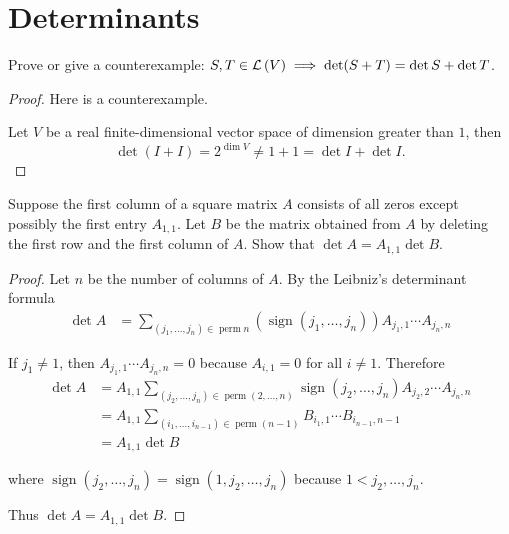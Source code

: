 \section{Determinants}

\begin{exercise}\label{chapter9:sectionC:exercise1}
    Prove or give a counterexample: $S, T\in\mathcal{L}\left({V}\right)\implies \det(S + T) = \det S + \det T$.
\end{exercise}

\begin{proof}
    Here is a counterexample.

    Let $V$ be a real finite-dimensional vector space of dimension greater than $1$, then
    \[
        \det(I + I) = 2^{\dim V} \ne 1 + 1 = \det I + \det I.
    \]
\end{proof}
\newpage

\begin{exercise}\label{chapter9:sectionC:exercise2}
    Suppose the first column of a square matrix $A$ consists of all zeros except possibly the first entry $A_{1,1}$. Let $B$ be the matrix obtained from $A$ by deleting the first row and the first column of $A$. Show that $\det A = A_{1,1} \det B$.
\end{exercise}

\begin{proof}
    Let $n$ be the number of columns of $A$. By the Leibniz's determinant formula
    \begin{align*}
        \det A & = \sum_{(j_{1}, \ldots, j_{n})\in\operatorname{perm}n}(\operatorname{sign}(j_{1}, \ldots, j_{n}))A_{j_{1},1}\cdots A_{j_{n},n}
    \end{align*}

    If $j_{1}\ne 1$, then $A_{j_{1},1}\cdots A_{j_{n},n} = 0$ because $A_{i,1} = 0$ for all $i\ne 1$. Therefore
    \begin{align*}
        \det A & = A_{1,1}\sum_{(j_{2}, \ldots, j_{n})\in\operatorname{perm}(2,\ldots,n)}\operatorname{sign}(j_{2}, \ldots, j_{n})A_{j_{2},2}\cdots A_{j_{n},n} \\
               & = A_{1,1}\sum_{(i_{1},\ldots, i_{n-1})\in\operatorname{perm}(n-1)}B_{i_{1},1}\cdots B_{i_{n-1},n-1}                                            \\
               & = A_{1,1}\det B
    \end{align*}

    where $\operatorname{sign}(j_{2}, \ldots, j_{n}) = \operatorname{sign}(1, j_{2}, \ldots, j_{n})$ because $1 < j_{2}, \ldots, j_{n}$.

    Thus $\det A = A_{1,1}\det B$.
\end{proof}
\newpage

